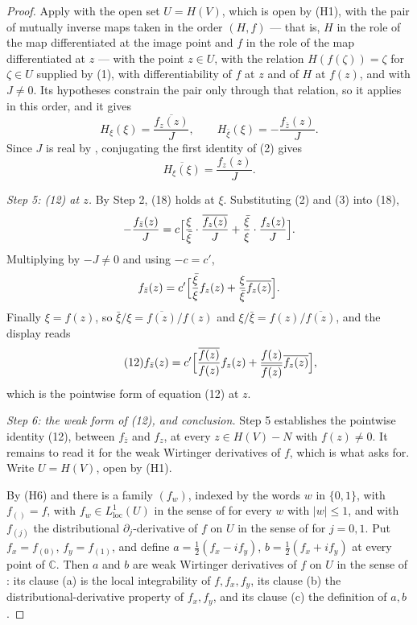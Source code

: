 \begin{proof}
Apply  with the open set $U=H(V)$, which is open by
(H1), with the pair of mutually inverse maps taken in the order $(H,f)$ --- that
is, $H$ in the role of the map differentiated at the image point and $f$ in the
role of the map differentiated at $z$ --- with the point $z\in U$, with the
relation $H(f(\zeta))=\zeta$ for $\zeta\in U$ supplied by (1), with
differentiability of $f$ at $z$ and of $H$ at $f(z)$, and with $J\neq0$.  Its
hypotheses constrain the pair only through that relation, so it applies in this
order, and it gives
\begin{equation}\tag{2}
  H_\xi(\xi)=\frac{\overline{f_z(z)}}{J},\qquad
  H_{\bar\xi}(\xi)=-\frac{f_{\bar z}(z)}{J}.
\end{equation}
Since $J$ is real by , conjugating the first identity of (2)
gives
\begin{equation}\tag{3}
  \overline{H_\xi(\xi)}=\frac{f_z(z)}{J}.
\end{equation}

\emph{Step 5: (12) at $z$.}  By Step 2, (18) holds at $\xi$.  Substituting (2)
and (3) into (18),
\[
  -\frac{f_{\bar z}(z)}{J}
  =c\Bigl[\frac{\xi}{\bar\xi}\cdot\frac{\overline{f_z(z)}}{J}
    +\frac{\bar\xi}{\xi}\cdot\frac{f_z(z)}{J}\Bigr].
\]
Multiplying by $-J\neq0$ and using $-c=c'$,
\[
  f_{\bar z}(z)
  =c'\Bigl[\frac{\bar\xi}{\xi}f_z(z)
    +\frac{\xi}{\bar\xi}\overline{f_z(z)}\Bigr].
\]
Finally $\xi=f(z)$, so $\bar\xi/\xi=\overline{f(z)}/f(z)$ and
$\xi/\bar\xi=f(z)/\overline{f(z)}$, and the display reads
\begin{equation}\tag{12}
  f_{\bar z}(z)=c'\Bigl[\frac{\overline{f(z)}}{f(z)}f_z(z)
    +\frac{f(z)}{\overline{f(z)}}\overline{f_z(z)}\Bigr],
\end{equation}
which is the pointwise form of equation (12) at $z$.

\emph{Step 6: the weak form of (12), and conclusion.}  Step 5 establishes the
pointwise identity (12), between $f_{\bar z}$ and $f_z$, at every
$z\in H(V)-N$ with $f(z)\neq0$.  It remains to read it for the weak Wirtinger
derivatives of $f$, which is what  asks for.  Write
$U=H(V)$, open by (H1).

By (H6) and  there is a family $(f_w)$, indexed by the words
$w$ in $\{0,1\}$, with $f_{()}=f$, with $f_w\in L^1_{\mathrm{loc}}(U)$ in the
sense of  for every $w$ with $|w|\le1$, and with $f_{(j)}$
the distributional $\partial_j$-derivative of $f$ on $U$ in the sense of
 for $j=0,1$.  Put $f_x=f_{(0)}$, $f_y=f_{(1)}$, and
define $a=\tfrac12(f_x-if_y)$, $b=\tfrac12(f_x+if_y)$ at every point of
$\mathbb{C}$.  Then $a$ and $b$ are weak Wirtinger derivatives of $f$ on $U$
in the sense of : its clause (a) is the local
integrability of $f,f_x,f_y$, its clause (b) the distributional-derivative
property of $f_x,f_y$, and its clause (c) the definition of $a,b$.


\end{proof}
